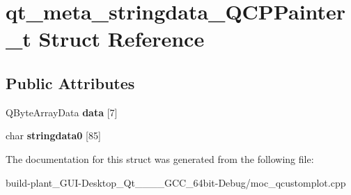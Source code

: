 \hypertarget{structqt__meta__stringdata__QCPPainter__t}{}\section{qt\+\_\+meta\+\_\+stringdata\+\_\+\+Q\+C\+P\+Painter\+\_\+t Struct Reference}
\label{structqt__meta__stringdata__QCPPainter__t}
\subsection*{Public Attributes}
\begin{DoxyCompactItemize}
\item 
\mbox{\label{structqt__meta__stringdata__QCPPainter__t_ad207c5d12c2c25b489d92c783a387865}} 
Q\+Byte\+Array\+Data {\bfseries data} \mbox{[}7\mbox{]}
\item 
\mbox{\label{structqt__meta__stringdata__QCPPainter__t_a5a729fecff22f5c3258902008085a51f}} 
char {\bfseries stringdata0} \mbox{[}85\mbox{]}
\end{DoxyCompactItemize}


The documentation for this struct was generated from the following file\+:\begin{DoxyCompactItemize}
\item 
build-\/plant\+\_\+\+G\+U\+I-\/\+Desktop\+\_\+\+Qt\+\_\+\_\+\_\+\_\+\+G\+C\+C\+\_\+64bit-\/\+Debug/moc\+\_\+qcustomplot.\+cpp\end{DoxyCompactItemize}
